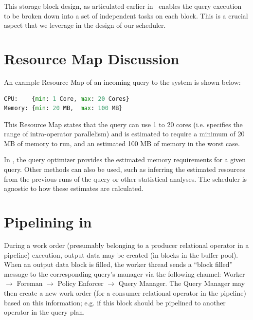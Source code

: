 This storage block design, as articulated earlier in~\cite{qsstorage} enables the query execution to be broken down into a set of independent tasks on each block. 
This is a crucial aspect that we leverage in the design of our scheduler. 


\section{Resource Map Discussion}\label{apx:resource-map}
An example Resource Map of an incoming query to the system is shown below:
\begin{lstlisting}[language=python, 
								   basicstyle=\ttfamily\small, 
								   showstringspaces=false,
								   keywordstyle=\color{bondiblue}\bfseries, 
								   emph={CPU, Memory}, 
								   emphstyle=\color{cardinal}\bfseries]
CPU:    {min: 1 Core, max: 20 Cores}
Memory: {min: 20 MB,  max: 100 MB}
\end{lstlisting}

This Resource Map states that the query can use 1 to 20 cores (i.e. specifies the range of intra-operator parallelism) and is estimated to require a minimum of 20 MB of memory to run, and an estimated 100 MB of memory in the worst case.

In \sys{}, the query optimizer provides the estimated memory requirements for a given query.
Other methods can also be used, such as inferring the estimated resources from the previous runs of the query or other statistical analyses.
The scheduler is agnostic to how these estimates are calculated.

\section{Pipelining in \sys{}}\label{apx:pipelining}
During a work order (presumably belonging to a producer relational operator in a pipeline) execution, output data may be created (in blocks in the buffer pool). 
When an output data block is filled, the worker thread sends a ``block filled'' message to the corresponding query's manager via the following channel: Worker $\rightarrow$ Foreman $\rightarrow$ Policy Enforcer $\rightarrow$ Query Manager.
The Query Manager may then create a new work order (for a consumer relational operator in the pipeline) based on this information;
e.g. if this block should be pipelined to another operator in the query plan.

